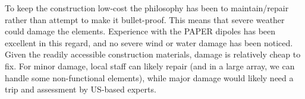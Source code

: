 \documentclass[preprint]{aastex}
\begin{document}
To keep the construction low-cost the philosophy has been to maintain/repair rather
than attempt to make it bullet-proof. This means that severe weather could damage the
elements. Experience with the PAPER dipoles has been excellent in this regard, and no
severe wind or water damage has been noticed. Given the readily accessible
construction materials, damage is relatively cheap to fix. For minor damage, local
staff can likely repair (and in a large array, we can handle some non-functional
elements), while major damage would likely need a trip and assessment by US-based
experts.
\end{document}
